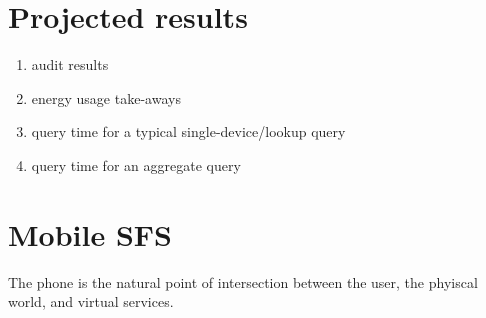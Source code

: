 

\section{Projected results}
\begin{enumerate}
\item audit results
\item energy usage take-aways
\item query time for a typical single-device/lookup query
\item query time for an aggregate query
\end{enumerate}




\section{Mobile SFS}
\label{sec:mobile}
The phone is the natural point of intersection between the user, the phyiscal world, and virtual services.\\

